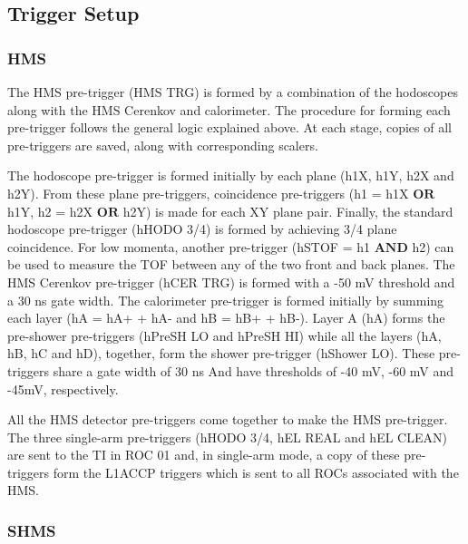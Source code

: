\documentclass[
]{report}
\begin{document}
\hypertarget{trigger-setup}{%
\subsection{Trigger Setup}\label{trigger-setup}}

\hypertarget{hms}{%
\subsubsection{HMS}\label{hms}}

The HMS pre-trigger (HMS TRG) is formed by a combination of the
hodoscopes along with the HMS Cerenkov and calorimeter. The procedure
for forming each pre-trigger follows the general logic explained above.
At each stage, copies of all pre-triggers are saved, along with
corresponding scalers.

The hodoscope pre-trigger is formed initially by each plane (h1X, h1Y,
h2X and h2Y). From these plane pre-triggers, coincidence pre-triggers
(h1 = h1X \(\textbf{OR}\) h1Y, h2 = h2X \(\textbf{OR}\) h2Y) is made for
each XY plane pair. Finally, the standard hodoscope pre-trigger (hHODO
3/4) is formed by achieving 3/4 plane coincidence. For low momenta,
another pre-trigger (hSTOF = h1 \(\textbf{AND}\) h2) can be used to
measure the TOF between any of the two front and back planes. The HMS
Cerenkov pre-trigger (hCER TRG) is formed with a -50 mV threshold and a
30 ns gate width. The calorimeter pre-trigger is formed initially by
summing each layer (hA = hA+ + hA- and hB = hB+ + hB-). Layer A (hA)
forms the pre-shower pre-triggers (hPreSH LO and hPreSH HI) while all
the layers (hA, hB, hC and hD), together, form the shower pre-trigger
(hShower LO). These pre-triggers share a gate width of 30 ns And have
thresholds of -40 mV, -60 mV and -45mV, respectively.

All the HMS detector pre-triggers come together to make the HMS
pre-trigger. The three single-arm pre-triggers (hHODO 3/4, hEL REAL and
hEL CLEAN) are sent to the TI in ROC 01 and, in single-arm mode, a copy
of these pre-triggers form the L1ACCP triggers which is sent to all ROCs
associated with the HMS.

\hypertarget{shms}{%
\subsubsection{SHMS}\label{shms}}
\end{document}
